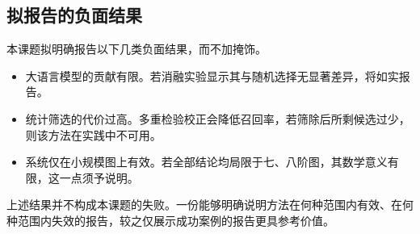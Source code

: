 \subsection{拟报告的负面结果}

本课题拟明确报告以下几类负面结果，而不加掩饰。

\begin{itemize}
  \item 大语言模型的贡献有限。若消融实验显示其与随机选择无显著差异，将如实报告。
  \item 统计筛选的代价过高。多重检验校正会降低召回率，若筛除后所剩候选过少，则该方法在实践中不可用。
  \item 系统仅在小规模图上有效。若全部结论均局限于七、八阶图，其数学意义有限，这一点须予说明。
\end{itemize}

上述结果并不构成本课题的失败。一份能够明确说明方法在何种范围内有效、在何种范围内失效的报告，较之仅展示成功案例的报告更具参考价值。
